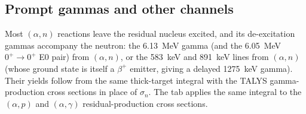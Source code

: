 \subsection{Prompt gammas and other channels}
Most $(\alpha,n)$ reactions leave the residual nucleus excited, and its de-excitation gammas accompany the neutron: the \SI{6.13}{MeV} gamma (and the \SI{6.05}{MeV} $0^+\to0^+$ E0 pair) from $(\alpha,n)$, or the \SI{583}{keV} and \SI{891}{keV} lines from $(\alpha,n)$ (whose ground state is itself a $\beta^+$ emitter, giving a delayed \SI{1275}{keV} gamma). Their yields follow from the same thick-target integral with the TALYS gamma-production cross sections in place of $\sigma_n$. The tab applies the same integral to the $(\alpha,p)$ and $(\alpha,\gamma)$ residual-production cross sections.

